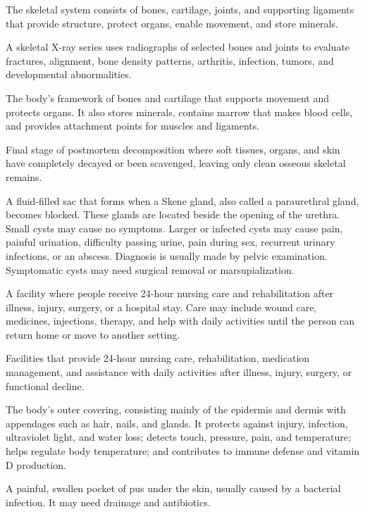  The skeletal system consists of bones, cartilage, joints, and supporting ligaments that provide structure, protect organs, enable movement, and store minerals.

 A skeletal X-ray series uses radiographs of selected bones and joints to evaluate fractures, alignment, bone density patterns, arthritis, infection, tumors, and developmental abnormalities.

 The body’s framework of bones and cartilage that supports movement and protects organs. It also stores minerals, contains marrow that makes blood cells, and provides attachment points for muscles and ligaments.

 Final stage of postmortem decomposition where soft tissues, organs, and skin have
completely decayed or been scavenged, leaving only clean osseous skeletal remains.

 A fluid-filled sac that forms when a Skene gland, also called a paraurethral gland, becomes blocked. These glands are located beside the opening of the urethra. Small cysts may cause no symptoms. Larger or infected cysts may cause pain, painful urination, difficulty passing urine, pain during sex, recurrent urinary infections, or an abscess. Diagnosis is usually made by pelvic examination. Symptomatic cysts may need surgical removal or marsupialization.

 A facility where people receive 24-hour nursing care and rehabilitation after illness, injury, surgery, or a hospital stay. Care may include wound care, medicines, injections, therapy, and help with daily activities until the person can return home or move to another setting.

 Facilities that provide 24-hour nursing care, rehabilitation, medication management, and assistance with daily activities after illness, injury, surgery, or functional decline.

 The body's outer covering, consisting mainly of the epidermis and dermis with appendages such as hair, nails, and glands. It protects against injury, infection, ultraviolet light, and water loss; detects touch, pressure, pain, and temperature; helps regulate body temperature; and contributes to immune defense and vitamin D production.

 A painful, swollen pocket of pus under the skin, usually caused by a bacterial infection. It may need drainage and antibiotics.

